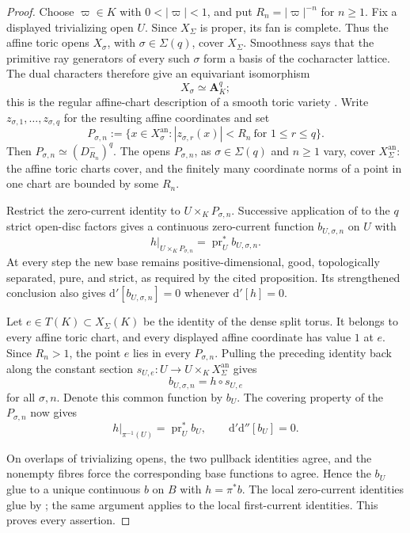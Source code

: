 \begin{proof}
Choose $\varpi\in K$ with $0<|\varpi|<1$, and put
$R_n=|\varpi|^{-n}$ for $n\geq1$.  Fix a displayed trivializing open
$U$.  Since $X_\Sigma$ is proper, its fan is complete.  Thus the affine
toric opens $X_\sigma$, with $\sigma\in\Sigma(q)$, cover $X_\Sigma$.
Smoothness says that the primitive ray generators of every such $\sigma$
form a basis of the cocharacter lattice.  The dual characters therefore
give an equivariant isomorphism
\[
                         X_\sigma\simeq\mathbf A_K^q;
\]
this is the regular affine-chart description of a smooth toric variety
\cite[Example~1.2.21 and Theorems~3.1.19 and~3.4.1]{CLS11}.  Write
$z_{\sigma,1},\ldots,z_{\sigma,q}$ for the
resulting affine coordinates and set
\[
 P_{\sigma,n}:=
 \bigl\{x\in X_\sigma^{\mathrm{an}}:
       |z_{\sigma,r}(x)|<R_n\ \text{for }1\leq r\leq q\bigr\}.
\]
Then $P_{\sigma,n}\simeq(D^-_{R_n})^q$.  The opens
$P_{\sigma,n}$, as $\sigma\in\Sigma(q)$ and $n\geq1$ vary, cover
$X_\Sigma^{\mathrm{an}}$: the affine toric charts cover, and the finitely
many coordinate norms of a point in one chart are bounded by some $R_n$.

Restrict the zero-current identity to
$U\times_KP_{\sigma,n}$.  Successive application of
 to the $q$ strict open-disc factors
gives a continuous zero-current function $b_{U,\sigma,n}$ on $U$ with
\[
 h|_{U\times_KP_{\sigma,n}}
      =\operatorname{pr}_U^*b_{U,\sigma,n}.
\]
At every step the new base remains positive-dimensional, good,
topologically separated, pure, and strict, as required by the cited
proposition.  Its strengthened conclusion also gives
$\mathrm d'[b_{U,\sigma,n}]=0$ whenever $\mathrm d'[h]=0$.

Let $e\in T(K)\subset X_\Sigma(K)$ be the identity of the dense split
torus.  It belongs to every affine toric chart, and every displayed affine
coordinate has value $1$ at $e$.  Since $R_n>1$, the point $e$
lies in every $P_{\sigma,n}$.  Pulling the preceding identity back along the
constant section $s_{U,e}:U\to U\times_KX_\Sigma^{\mathrm{an}}$ gives
\[
                  b_{U,\sigma,n}=h\circ s_{U,e}
\]
for all $\sigma,n$.  Denote this common function by $b_U$.  The covering
property of the $P_{\sigma,n}$ now gives
\[
                   h|_{\pi^{-1}(U)}=\operatorname{pr}_U^*b_U,
                   \qquad
                   \mathrm d'\mathrm d''[b_U]=0.
\]

On overlaps of trivializing opens, the two pullback identities agree, and
the nonempty fibres force the corresponding base functions to agree.  Hence
the $b_U$ glue to a unique continuous $b$ on $B$ with
$h=\pi^*b$.  The local zero-current identities glue by
; the same argument applies to the local
first-current identities.  This proves every assertion.
\end{proof}
